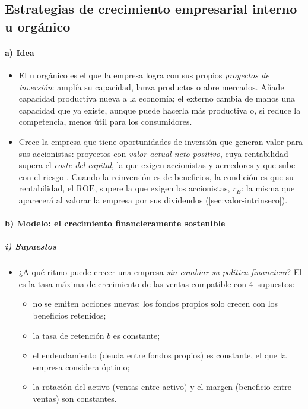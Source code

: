 \documentclass[11pt]{article}
\begin{document}
\subsection{Estrategias de crecimiento empresarial interno u orgánico}\label{sec:interno}

\paragraph{a) Idea}

\begin{itemize}
\item El  u orgánico es el que la empresa logra con sus propios \emph{proyectos de inversión}: amplía su capacidad, lanza productos o abre mercados. Añade capacidad productiva nueva a la economía; el externo cambia de manos una capacidad que ya existe, aunque puede hacerla más productiva o, si reduce la competencia, menos útil para los consumidores.
\item Crece la empresa que tiene oportunidades de inversión que generan valor para sus accionistas: proyectos con \emph{valor actual neto positivo}, cuya rentabilidad supera el \emph{coste del capital}, la que exigen accionistas y acreedores y que sube con el riesgo . Cuando la reinversión es de beneficios, la condición es que su rentabilidad, el $\mathrm{ROE}$, supere la que exigen los accionistas, $r_E$: la misma que aparecerá al valorar la empresa por sus dividendos (\ref{sec:valor-intrinseco}).
\end{itemize}

\paragraph{b) Modelo: el crecimiento financieramente sostenible}

\subparagraph{i) Supuestos}

\begin{itemize}
\item ¿A qué ritmo puede crecer una empresa \emph{sin cambiar su política financiera}? El \nocite{Higgins1977How} es la tasa máxima de crecimiento de las ventas compatible con 4~supuestos:
  \begin{itemize}
  \item no se emiten acciones nuevas: los fondos propios solo crecen con los beneficios retenidos;
  \item la tasa de retención $b$ es constante;
  \item el endeudamiento (deuda entre fondos propios) es constante, el que la empresa considera óptimo;
  \item la rotación del activo (ventas entre activo) y el margen (beneficio entre ventas) son constantes.
  \end{itemize}
\end{itemize}
\end{document}

